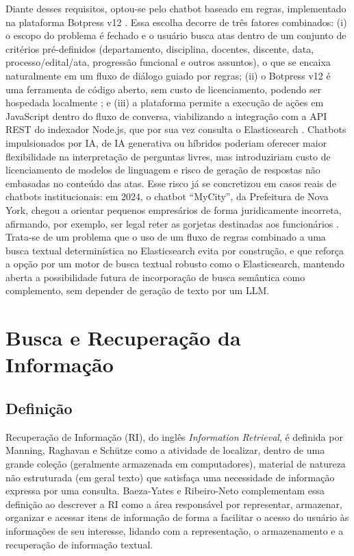 Diante desses requisitos, optou-se pelo chatbot baseado em regras, implementado na plataforma Botpress v12 \cite{botpress-about, botpress-docs}. Essa escolha decorre de três fatores combinados: (i) o escopo do problema é fechado e o usuário busca atas dentro de um conjunto de critérios pré-definidos (departamento, disciplina, docentes, discente, data, processo/edital/ata, progressão funcional e outros assuntos), o que se encaixa naturalmente em um fluxo de diálogo guiado por regras; (ii) o Botpress v12 é uma ferramenta de código aberto, sem custo de licenciamento, podendo ser hospedada localmente \cite{botpress-about}; e (iii) a plataforma permite a execução de ações em JavaScript dentro do fluxo de conversa, viabilizando a integração com a API REST do indexador Node.js, que por sua vez consulta o Elasticsearch \cite{IBMElasticsearch}. Chatbots impulsionados por IA, de IA generativa ou híbridos poderiam oferecer maior flexibilidade na interpretação de perguntas livres, mas introduziriam custo de licenciamento de modelos de linguagem e risco de geração de respostas não embasadas no conteúdo das atas. Esse risco já se concretizou em casos reais de chatbots institucionais: em 2024, o chatbot ``MyCity'', da Prefeitura de Nova York, chegou a orientar pequenos empresários de forma juridicamente incorreta, afirmando, por exemplo, ser legal reter as gorjetas destinadas aos funcionários \cite{mycity-thecity}. Trata-se de um problema que o uso de um fluxo de regras combinado a uma busca textual determinística no Elasticsearch evita por construção, e que reforça a opção por um motor de busca textual robusto como o Elasticsearch, mantendo aberta a possibilidade futura de incorporação de busca semântica como complemento, sem depender de geração de texto por um LLM.

\section{Busca e Recuperação da Informação}\label{sec:busca-recuperacao-informacao}

\subsection{Definição}

Recuperação de Informação (RI), do inglês \textit{Information Retrieval}, é definida por Manning, Raghavan e Schütze \cite{manning2008ir} como a atividade de localizar, dentro de uma grande coleção (geralmente armazenada em computadores), material de natureza não estruturada (em geral texto) que satisfaça uma necessidade de informação expressa por uma consulta. Baeza-Yates e Ribeiro-Neto \cite{baezayates2010modern} complementam essa definição ao descrever a RI como a área responsável por representar, armazenar, organizar e acessar itens de informação de forma a facilitar o acesso do usuário às informações de seu interesse, lidando com a representação, o armazenamento e a recuperação de informação textual.

